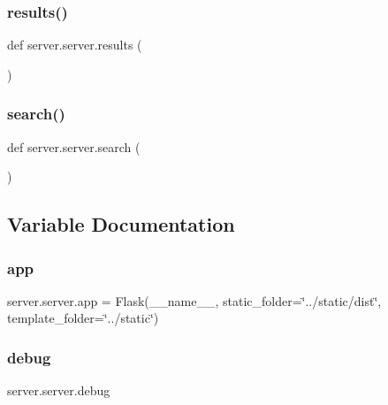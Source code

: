 \subsubsection{\texorpdfstring{results()}{results()}}
{\footnotesize\ttfamily def server.\+server.\+results (\begin{DoxyParamCaption}{ }\end{DoxyParamCaption})}

\mbox{\label{namespaceserver_1_1server_ae5d697d5408aeb2f94e2aa610a4706aa}} 
\subsubsection{\texorpdfstring{search()}{search()}}
{\footnotesize\ttfamily def server.\+server.\+search (\begin{DoxyParamCaption}{ }\end{DoxyParamCaption})}



\subsection{Variable Documentation}
\mbox{\label{namespaceserver_1_1server_abe540ab6e7c9bffd61dda91273e699e2}} 
\subsubsection{\texorpdfstring{app}{app}}
{\footnotesize\ttfamily server.\+server.\+app = Flask(\+\_\+\+\_\+name\+\_\+\+\_\+, static\+\_\+folder=\char`\"{}../static/dist\char`\"{}, template\+\_\+folder=\char`\"{}../static\char`\"{})}

\mbox{\label{namespaceserver_1_1server_addf5a8b97b626d4622f3fb2b2f8065ab}} 
\subsubsection{\texorpdfstring{debug}{debug}}
{\footnotesize\ttfamily server.\+server.\+debug}

